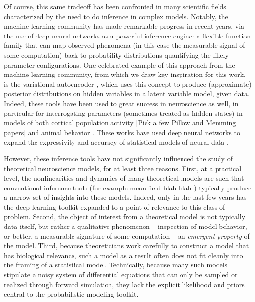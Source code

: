 \documentclass[11pt]{article}
\begin{document}
Of course, this same tradeoff has been confronted in many scientific fields characterized by the need to do inference in complex models.  
Notably, the machine learning community has made remarkable progress in recent years, via the use of deep neural networks as a powerful inference engine: a flexible function family that can map observed phenomena (in this case the measurable signal of some computation) back to probability distributions quantifying the likely parameter configurations.  
One celebrated example of this approach from the machine learning community, from which we draw key inspiration for this work, is the variational autoencoder \cite{kingma2013auto, rezende2015variational}, which uses this concept to produce (approximate) posterior distributions on hidden variables in a latent variable model, given data. 
Indeed, these tools have been used to great success in neuroscience as well, in particular for interrogating parameters (sometimes treated as hidden states) in models of both cortical population activity \cite{gao2016linear, pandarinath2018inferring} [Pick a few Pillow and Memming papers]  and animal behavior \cite{wiltschko2015mapping, johnson2016composing, batty2019behavenet}. 
These works have used deep neural networks to expand the expressivity and accuracy of statistical models of neural data \cite{paninski2018neural}. 

However, these inference tools have not significantly influenced the study of theoretical neuroscience models, for at least three reasons.  
First, at a practical level, the nonlinearities and dynamics of many theoretical models are such that conventional inference tools (for example mean field blah blah \cite{???}) typically produce a narrow set of insights into these models.  
Indeed, only in the last few years has the deep learning toolkit expanded to a point of relevance to this class of problem.
Second, the object of interest from a theoretical model is not typically data itself, but rather a qualitative phenomenon -- inspection of model behavior, or better, a measurable signature of some computation -- an \emph{emergent property} of the model.  
Third, because theoreticians work carefully to construct a model that has biological relevance, such a model as a result often does not fit cleanly into the framing of a statistical model.  
Technically, because many such models stipulate a noisy system of differential equations that can only be sampled or realized through forward simulation, they lack the explicit likelihood and priors central to the probabilistic modeling toolkit.  
\end{document}
